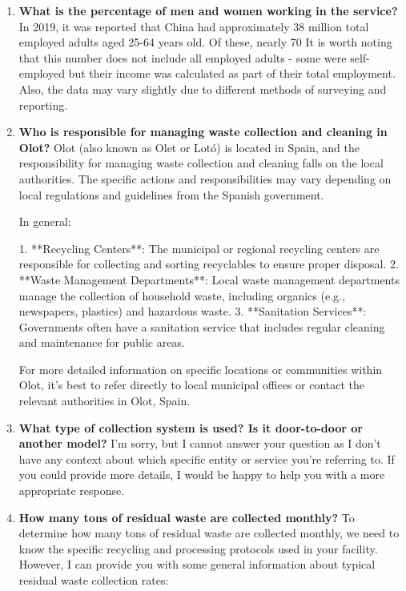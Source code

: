 \begin{enumerate}
If you could specify which diesel brand or model, provide the quantity (in liters), and any relevant details about your vehicle's usage, I would be happy to assist you with a more accurate estimate. Otherwise, without this information, I can't determine how many liters of diesel are consumed monthly in your case.
\item \textbf{What is the percentage of men and women working in the service?}
In 2019, it was reported that China had approximately 38 million total employed adults aged 25-64 years old. Of these, nearly 70%
It is worth noting that this number does not include all employed adults - some were self-employed but their income was calculated as part of their total employment. Also, the data may vary slightly due to different methods of surveying and reporting.
\item \textbf{Who is responsible for managing waste collection and cleaning in Olot?}
Olot (also known as Olet or Lotó) is located in Spain, and the responsibility for managing waste collection and cleaning falls on the local authorities. The specific actions and responsibilities may vary depending on local regulations and guidelines from the Spanish government.

In general:

1. **Recycling Centers**: The municipal or regional recycling centers are responsible for collecting and sorting recyclables to ensure proper disposal.
2. **Waste Management Departments**: Local waste management departments manage the collection of household waste, including organics (e.g., newspapers, plastics) and hazardous waste.
3. **Sanitation Services**: Governments often have a sanitation service that includes regular cleaning and maintenance for public areas.

For more detailed information on specific locations or communities within Olot, it's best to refer directly to local municipal offices or contact the relevant authorities in Olot, Spain.
\item \textbf{What type of collection system is used? Is it door-to-door or another model?}
I'm sorry, but I cannot answer your question as I don't have any context about which specific entity or service you're referring to. If you could provide more details, I would be happy to help you with a more appropriate response.
\item \textbf{How many tons of residual waste are collected monthly?}
To determine how many tons of residual waste are collected monthly, we need to know the specific recycling and processing protocols used in your facility. However, I can provide you with some general information about typical residual waste collection rates:


\end{enumerate}
